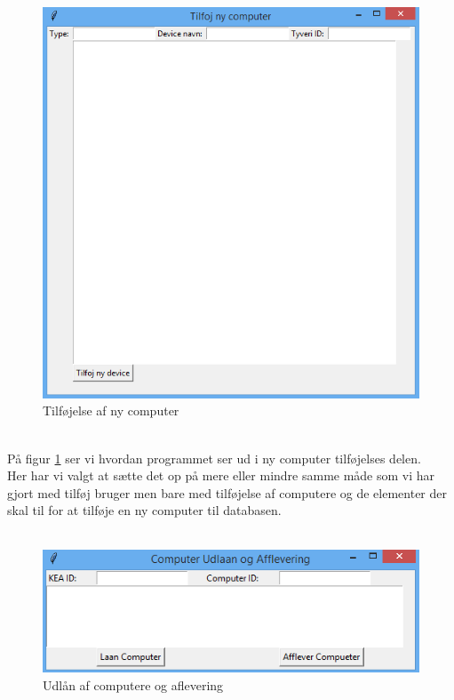 \documentclass[a4paper]{article}
\begin{document}
\begin{figure}[h!]
\centering
\includegraphics[width=1\textwidth]{Tilfojcomputer.png}
\caption{Tilføjelse af ny computer}
\label{fig:GUI2}
\end{figure}
\\
På figur \ref{fig:GUI2} ser vi hvordan programmet ser ud i ny computer tilføjelses delen.\\
Her har vi valgt at sætte det op på mere eller mindre samme måde som vi har gjort med tilføj bruger men bare med tilføjelse af computere og de elementer der skal til for at tilføje en ny computer til databasen.\\
\\[0.1in]
\begin{figure}[h!]
\centering
\includegraphics[width=1\textwidth]{Udlan.png}
\caption{Udlån af computere og aflevering}
\label{fig:GUI3}
\end{figure}
\end{document}
